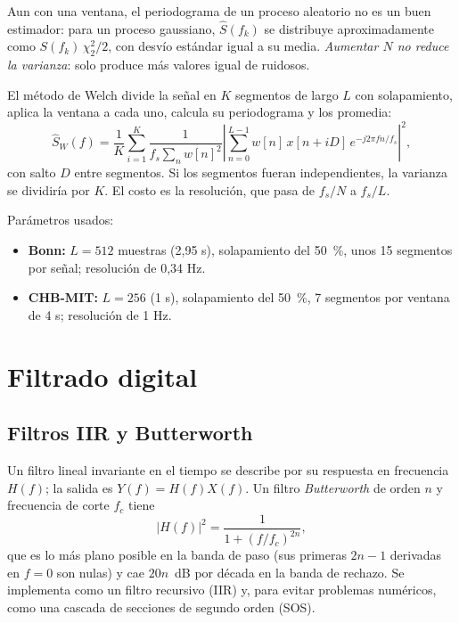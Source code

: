 Aun con una ventana, el periodograma de un proceso aleatorio no es un buen estimador: para un proceso
gaussiano, $\hat S(f_k)$ se distribuye aproximadamente como $S(f_k)\,\chi^2_2/2$, con desvío estándar
igual a su media. \emph{Aumentar $N$ no reduce la varianza}: solo produce más valores igual de ruidosos.

El método de Welch \parencite{welch1967} divide la señal en $K$ segmentos de largo $L$ con solapamiento,
aplica la ventana a cada uno, calcula su periodograma y los promedia:
\begin{equation}
  \hat S_W(f) = \frac1K\sum_{i=1}^{K} \frac{1}{f_s \sum_n w[n]^2}\left|\sum_{n=0}^{L-1} w[n]\, x[n + iD]\, e^{-j2\pi fn/f_s}\right|^2,
  \label{eq:welch}
\end{equation}
con salto $D$ entre segmentos. Si los segmentos fueran independientes, la varianza se dividiría por
$K$. El costo es la resolución, que pasa de $f_s/N$ a $f_s/L$.

Parámetros usados:
\begin{itemize}
  \item \textbf{Bonn:} $L = 512$ muestras (2,95 s), solapamiento del 50~\%, unos 15 segmentos
        por señal; resolución de 0,34 Hz.
  \item \textbf{CHB-MIT:} $L = 256$ (1 s), solapamiento del 50~\%, 7 segmentos por ventana de 4 s;
        resolución de 1 Hz.
\end{itemize}

\section{Filtrado digital}

\subsection{Filtros IIR y Butterworth}

Un filtro lineal invariante en el tiempo se describe por su respuesta en frecuencia $H(f)$; la salida es
$Y(f) = H(f)X(f)$. Un filtro \emph{Butterworth} de orden $n$ y frecuencia de corte $f_c$ tiene
\begin{equation}
  |H(f)|^2 = \frac{1}{1 + (f/f_c)^{2n}},
\end{equation}
que es lo más plano posible en la banda de paso (sus primeras $2n-1$ derivadas en $f = 0$ son nulas) y cae
$20n$~dB por década en la banda de rechazo. Se implementa como un filtro recursivo (IIR) y, para evitar
problemas numéricos, como una cascada de secciones de segundo orden (SOS).

